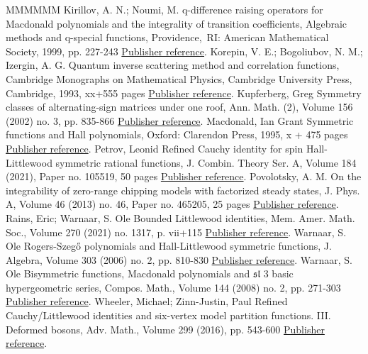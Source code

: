 \begin{thebibliography}{MMMMMM}
 Kirillov, A. N.; Noumi, M. q-difference raising operators for Macdonald polynomials and the integrality of transition coefficients, Algebraic methods and q-special functions, Providence, RI: American Mathematical Society, 1999, pp. 227-243 \href{https://alco.centre-mersenne.org/articles/10.5802/alco.251/#KN99}{Publisher reference}.
 Korepin, V. E.; Bogoliubov, N. M.; Izergin, A. G. Quantum inverse scattering method and correlation functions, Cambridge Monographs on Mathematical Physics, Cambridge University Press, Cambridge, 1993, xx+555 pages \href{https://alco.centre-mersenne.org/articles/10.5802/alco.251/#KBI93}{Publisher reference}.
 Kupferberg, Greg Symmetry classes of alternating-sign matrices under one roof, Ann. Math. (2), Volume 156 (2002) no. 3, pp. 835-866 \href{https://alco.centre-mersenne.org/articles/10.5802/alco.251/#Kup02}{Publisher reference}.
 Macdonald, Ian Grant Symmetric functions and Hall polynomials, Oxford: Clarendon Press, 1995, x + 475 pages \href{https://alco.centre-mersenne.org/articles/10.5802/alco.251/#Mac95}{Publisher reference}.
 Petrov, Leonid Refined Cauchy identity for spin Hall-Littlewood symmetric rational functions, J. Combin. Theory Ser. A, Volume 184 (2021), Paper no. 105519, 50 pages \href{https://alco.centre-mersenne.org/articles/10.5802/alco.251/#Pet21}{Publisher reference}.
 Povolotsky, A. M. On the integrability of zero-range chipping models with factorized steady states, J. Phys. A, Volume 46 (2013) no. 46, Paper no. 465205, 25 pages \href{https://alco.centre-mersenne.org/articles/10.5802/alco.251/#Pov13}{Publisher reference}.
 Rains, Eric; Warnaar, S. Ole Bounded Littlewood identities, Mem. Amer. Math. Soc., Volume 270 (2021) no. 1317, p. vii+115 \href{https://alco.centre-mersenne.org/articles/10.5802/alco.251/#RW21}{Publisher reference}.
 Warnaar, S. Ole Rogers-Szegő polynomials and Hall-Littlewood symmetric functions, J. Algebra, Volume 303 (2006) no. 2, pp. 810-830 \href{https://alco.centre-mersenne.org/articles/10.5802/alco.251/#War06}{Publisher reference}.
 Warnaar, S. Ole Bisymmetric functions, Macdonald polynomials and \(\mathfrak{s}\)\(\mathfrak{l}\) 3  basic hypergeometric series, Compos. Math., Volume 144 (2008) no. 2, pp. 271-303 \href{https://alco.centre-mersenne.org/articles/10.5802/alco.251/#War08}{Publisher reference}.
 Wheeler, Michael; Zinn-Justin, Paul Refined Cauchy/Littlewood identities and six-vertex model partition functions. III. Deformed bosons, Adv. Math., Volume 299 (2016), pp. 543-600 \href{https://alco.centre-mersenne.org/articles/10.5802/alco.251/#WZJ16}{Publisher reference}.
\end{thebibliography}
